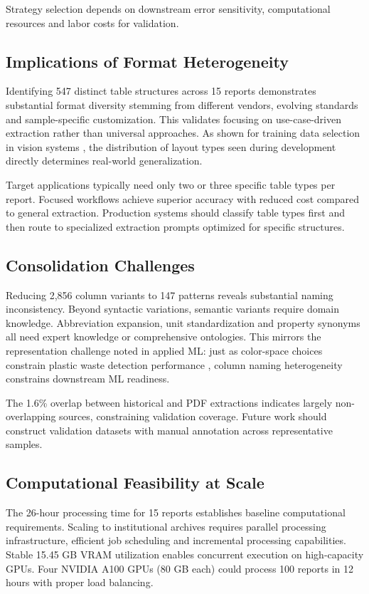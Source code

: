 \documentclass[conference]{IEEEtran}
\begin{document}
Strategy selection depends on downstream error sensitivity, computational resources and labor costs for validation.

\subsection{Implications of Format Heterogeneity}

Identifying 547 distinct table structures across 15 reports demonstrates substantial format diversity stemming from different vendors, evolving standards and sample-specific customization. This validates focusing on use-case-driven extraction rather than universal approaches. As shown for training data selection in vision systems \cite{dargham2015}, the distribution of layout types seen during development directly determines real-world generalization.

Target applications typically need only two or three specific table types per report. Focused workflows achieve superior accuracy with reduced cost compared to general extraction. Production systems should classify table types first and then route to specialized extraction prompts optimized for specific structures.

\subsection{Consolidation Challenges}

Reducing 2,856 column variants to 147 patterns reveals substantial naming inconsistency. Beyond syntactic variations, semantic variants require domain knowledge. Abbreviation expansion, unit standardization and property synonyms all need expert knowledge or comprehensive ontologies. This mirrors the representation challenge noted in applied ML: just as color-space choices constrain plastic waste detection performance \cite{tamin2022}, column naming heterogeneity constrains downstream ML readiness.

The 1.6\% overlap between historical and PDF extractions indicates largely non-overlapping sources, constraining validation coverage. Future work should construct validation datasets with manual annotation across representative samples.

\subsection{Computational Feasibility at Scale}

The 26-hour processing time for 15 reports establishes baseline computational requirements. Scaling to institutional archives requires parallel processing infrastructure, efficient job scheduling and incremental processing capabilities. Stable 15.45 GB VRAM utilization enables concurrent execution on high-capacity GPUs. Four NVIDIA A100 GPUs (80 GB each) could process 100 reports in 12 hours with proper load balancing.
\end{document}
